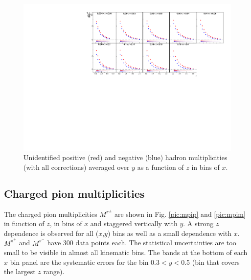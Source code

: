 \begin{figure}[!h]
  \centering
	\includegraphics[scale=0.85]{./gfx/hyavg.pdf}
	\caption{Unidentified positive (red) and negative (blue) hadron multiplicities (with all corrections) averaged over $y$ as a function of $z$ in bins of $x$.}
	\label{pic:mhyavg}
\end{figure}

\newpage

\subsection{Charged pion multiplicities}

The charged pion multiplicities $M^{\pi^{\pm}}$ are shown in Fig. \ref{pic:mpip} and \ref{pic:mpim} in function of $z$, in bins of $x$ and staggered vertically with $y$. A strong $z$ dependence is observed for all ($x$,$y$) bins as well as a small dependence with $x$. $M^{\pi^+}$ and $M^{\pi^-}$ have 300 data points each. The statistical uncertainties are too small to be visible in almost all kinematic bins. The bands at the bottom of each $x$ bin panel are the systematic errors for the bin 0.3$< y <$0.5 (bin that covers the largest $z$ range).

